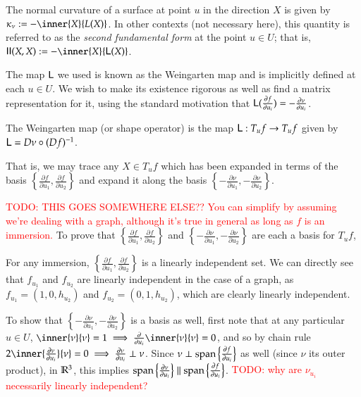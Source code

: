 		\begin{defn}
			The normal curvature of a surface at point $u$ in the direction $X$ is given by $\kappa_\nu := - \inner{X}{L(X)}$. In other contexts (not necessary here), this quantity is referred to as the \textit{second fundamental form} at the point $u \in U$; that is, $ \mathbf{II}(X,X) := - \inner{X}{\wein(X)}$.
		\end{defn}
		
		
		
		The map $\mathsf{L}$ we used is known as the Weingarten map
		and is implicitly defined at each $u \in U$. 
		We wish to make its existence rigorous as well as find a matrix representation for it, using the standard motivation that $\mathsf{L}(\frac{\partial f}{\partial u_i}) = - \frac{\partial \nu}{\partial u_i}$.
		
	
		\begin{defn}
		The Weingarten map (or shape operator) is the map $\mathsf{L}: T_u f \to T_u f$ given by
		$\mathsf{L} = D\nu \circ (Df)^{-1}$.
		\end{defn}
		
		That is, we may trace any $X \in T_u f$ which has been expanded in terms of the basis 
		$\left\{\frac{\partial f}{\partial u_1} , \frac{\partial f}{\partial u_2}\right\}$
		and expand it along the basis $\left\{-\frac{\partial \nu}{\partial u_1} , -\frac{\partial \nu}{\partial u_2}\right\}$. 
		
		\textcolor{red}{TODO: THIS GOES SOMEWHERE ELSE?? You can simplify by assuming we're dealing with a graph, although it's true in general as long as $f$ is an immersion.}
		To prove that $\left\{\frac{\partial f}{\partial u_1} , \frac{\partial f}{\partial u_2}\right\}$ and $\left\{-\frac{\partial \nu}{\partial u_1} , -\frac{\partial \nu}{\partial u_2}\right\}$ are each a basis for $T_u f$,
		
		For any immersion, $\left\{\frac{\partial f}{\partial u_1} , \frac{\partial f}{\partial u_2}\right\}$ is a linearly independent set. We can directly see that $f_{u_1}$ and $f_{u_2}$ are linearly independent in the case of a graph, as $f_{u_1} = (1,0,h_{u_2})$ and $f_{u_2} = (0,1,h_{u_2})$, which are clearly linearly independent.
		
		To show that $\left\{-\frac{\partial \nu}{\partial u_1} , -\frac{\partial \nu}{\partial u_2}\right\}$ is a basis as well,
		first note that at any particular $u \in U$,
		$\inner{\nu}{\nu} = 1 \implies \frac{\partial}{\partial u_i} \inner{\nu}{\nu} = 0$,
		and so by chain rule $2\inner{\frac{\partial \nu}{\partial u_i}}{\nu} = 0
		\implies \frac{\partial \nu}{\partial u_i} \perp \nu $.
			Since $ \nu \perp \mathrm{span}\left\{\frac{\partial f}{\partial u_i}\right\} $ as well (since $\nu$ its outer product), in  $\mathbb{R}^3$, this implies
			$\mathrm{span}\left\{\frac{\partial \nu}{\partial u_i}\right\} \parallel
			\mathrm{span}\left\{\frac{\partial f}{\partial u_i}\right\}$.
			\textcolor{red}{TODO: why are $\nu_{u_i}$ necessarily linearly independent?}
		
